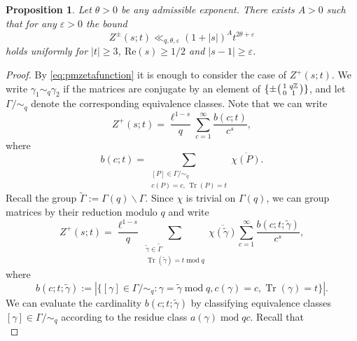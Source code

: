 \documentclass{article}
\newtheorem{prop}[thm]{Proposition}
\theoremstyle{named}
\newcommand{\Z}{\mathbb{Z}}
\DeclareMathOperator{\Tr}{Tr}
\DeclareMathOperator{\modulo}{mod}
\begin{document}
\begin{prop}\label{prop:boundzagierzetafunction}
Let $\theta> 0$ be any admissible exponent. There exists $A > 0$ such that for any $\varepsilon > 0$ the bound
    \begin{equation*}
        Z^{\pm}(s; t) \ll_{q, \theta, \varepsilon} (1 + |s|)^A t^{2\theta + \varepsilon} 
    \end{equation*}
holds uniformly for $|t| \geq 3$, $\text{Re}(s) \geq 1/2$ and $|s - 1| \geq \varepsilon$. 
\end{prop}


\begin{proof}
By \eqref{eq:pmzetafunction} it is enough to consider the case of $Z^+(s; t)$. We write $\gamma_1 \sim_q \gamma_2$ if the matrices are conjugate by an element of $\{\pm \begin{psmallmatrix}
    1 & q\Z\\
    0 & 1
\end{psmallmatrix}\}$, and let $\Gamma/\sim_q$ denote the corresponding equivalence classes. Note that we can write
\begin{equation*}
    Z^+(s; t) = \frac{\ell^{1-s}}{q}  \sum_{c = 1}^\infty \frac{b(c; t)}{c^s},
\end{equation*}
where 
\begin{equation*}
    b(c; t) = \sum_{\substack{[P] \in \Gamma/\sim_q\\
    c(P) = c, \, \Tr(P) = t}} \overline{\chi(P)}.
\end{equation*}
Recall the group $\widetilde{\Gamma} := \Gamma(q)\backslash \Gamma$. Since $\chi$ is trivial on $\Gamma(q)$, we can group matrices  by their reduction modulo $q$ and write
\begin{equation*}
    Z^+(s; t) = \frac{\ell^{1-s}}{q}\sum_{\substack{\widetilde{\gamma} \in \widetilde{\Gamma}\\
    \Tr(\widetilde{\gamma}) = t \modulo q}} \overline{\chi\left(\widetilde{\gamma}\right)} \sum_{c = 1}^\infty \frac{b(c; t; \widetilde{\gamma})}{c^s},
\end{equation*}
where 
\begin{equation*}
    b(c; t; \widetilde{\gamma}) := \left|\{[\gamma] \in \Gamma/\sim_q : \gamma = \widetilde{\gamma} \modulo q, c(\gamma) = c, \Tr(\gamma) = t\}\right|.
\end{equation*}
We can evaluate the cardinality $b(c; t; \widetilde{\gamma})$ by classifying equivalence classes $[\gamma] \in \Gamma/\sim_q$ according to the residue class $a(\gamma) \modulo qc$. Recall that 
\begin{equation*}

\end{equation*}
\end{proof}
\end{document}
